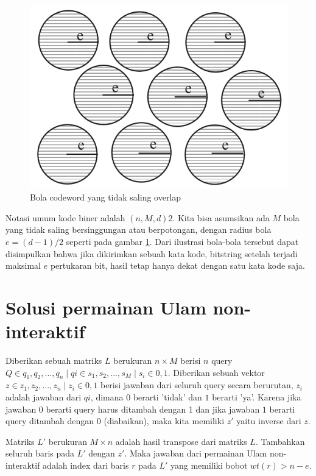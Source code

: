 \documentclass[conference,compsoc]{IEEEtran}
\begin{document}
\begin{figure}
\centering
\includegraphics[width=\linewidth]{../img/codewordsball.png}
\caption{Bola codeword yang tidak saling overlap}
\label{fig:codewordsball}
\end{figure}

Notasi umum kode biner adalah $(n,M,d)2$. Kita bisa asumsikan ada $M$ bola yang tidak saling bersinggungan atau berpotongan, dengan radius bola $e=(d-1)/2$ seperti pada gambar \ref{fig:codewordsball}. Dari ilustrasi bola-bola tersebut dapat disimpulkan bahwa jika dikirimkan sebuah kata kode, bitstring setelah terjadi maksimal $e$ pertukaran bit, hasil tetap hanya dekat dengan satu kata kode saja.


\section{Solusi permainan Ulam non-interaktif}

Diberikan sebuah matriks $L$ berukuran $n \times M$ berisi $n$ query $Q\in{q_1,q_2,...,q_n} \mid qi\in{s_1,s_2,...,s_M} \mid s_i\in{0,1}$. Diberikan sebuah vektor $z \in {z_1,z_2,...,z_n} \mid z_i\in{0,1}$ berisi jawaban dari seluruh query secara berurutan, $z_i$ adalah jawaban dari $qi$, dimana $0$ berarti 'tidak' dan $1$ berarti 'ya'. Karena jika jawaban $0$ berarti query harus ditambah dengan 1 dan jika jawaban $1$ berarti query ditambah dengan 0 (diabaikan), maka kita memiliki $z'$ yaitu inverse dari $z$. 

Matriks $L'$ berukuran $M \times n$ adalah hasil transpose dari matriks $L$. Tambahkan seluruh baris pada $L'$ dengan $z'$. Maka jawaban dari permainan Ulam non-interaktif adalah index dari baris $r$ pada $L'$ yang memiliki bobot $wt(r) > n-e$.
\end{document}
